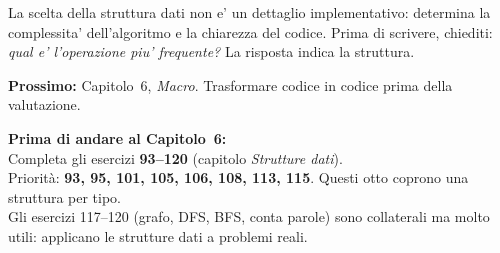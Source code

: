 \begin{intuizione}
La scelta della struttura dati non e' un dettaglio implementativo:
determina la complessita' dell'algoritmo e la chiarezza del codice.
Prima di scrivere, chiediti: \emph{qual e' l'operazione piu' frequente?}
La risposta indica la struttura.
\end{intuizione}

\medskip
\textbf{Prossimo:} Capitolo~6, \emph{Macro}.
Trasformare codice in codice prima della valutazione.

\begin{workbook}
\textbf{Prima di andare al Capitolo~6:}\\[4pt]
Completa gli esercizi \textbf{93--120} (capitolo
\emph{Strutture dati}).\\[4pt]
Priorità: \textbf{93, 95, 101, 105, 106, 108, 113, 115}.
Questi otto coprono una struttura per tipo.\\[4pt]
Gli esercizi 117--120 (grafo, DFS, BFS, conta parole) sono
collaterali ma molto utili: applicano le strutture dati a
problemi reali.
\end{workbook}

